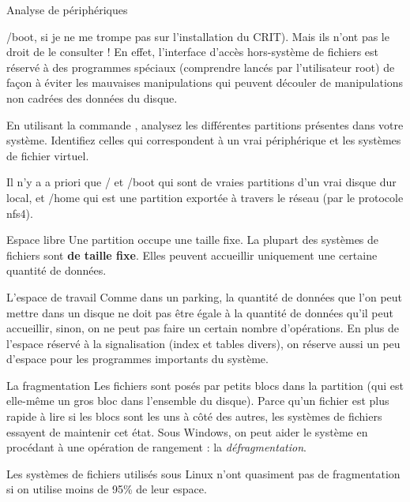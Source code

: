 \begin{exercice}
\begin{exercicelet}{Analyse de périphériques}
\begin{questions}
\begin{correction}
        /boot, si je ne me trompe pas sur l'installation du CRIT). Mais
        ils n'ont pas le droit de le consulter ! En effet, l'interface
        d'accès hors-système de fichiers est réservé à des programmes
        spéciaux (comprendre lancés par l'utilisateur root) de façon à
        éviter les mauvaises manipulations qui peuvent découler de
        manipulations non cadrées des données du disque.
      \end{correction}
    \item En utilisant la commande , analysez les différentes
      partitions présentes dans votre système. Identifiez celles qui
      correspondent à un vrai périphérique et les systèmes de fichier
      virtuel.
      \begin{correction}
        Il n'y a a priori que / et /boot qui sont de vraies partitions
        d'un vrai disque dur local, et /home qui est une partition
        exportée à travers le réseau (par le protocole nfs4).
      \end{correction}
    \end{questions}
  \end{exercicelet}
\end{exercice}

\begin{frame}{Espace libre}
  Une partition occupe une taille fixe. La plupart des systèmes de
  fichiers sont \textbf{de taille fixe}. Elles peuvent accueillir
  uniquement une certaine quantité de données.
  \begin{alertblock}{L'espace de travail}
    Comme dans un parking, la quantité de données que l'on peut mettre
    dans un disque ne doit pas être égale à la quantité de données qu'il
    peut accueillir, sinon, on ne peut pas faire un certain nombre
    d'opérations. En plus de l'espace réservé à la signalisation (index
    et tables divers), on réserve aussi un peu d'espace pour les
    programmes importants du système.
  \end{alertblock}
  \begin{alertblock}{La fragmentation}
    Les fichiers sont posés par petits blocs dans la partition (qui est
    elle-même un gros bloc dans l'ensemble du disque). Parce qu'un
    fichier est plus rapide à lire si les blocs sont les uns à côté des
    autres, les systèmes de fichiers essayent de maintenir cet
    état. Sous Windows, on peut aider le système en procédant à une
    opération de rangement : la \emph{défragmentation}.

    Les systèmes de fichiers utilisés sous Linux n'ont quasiment pas de
    fragmentation si on utilise moins de 95\% de leur espace.
  \end{alertblock}
\end{frame}

